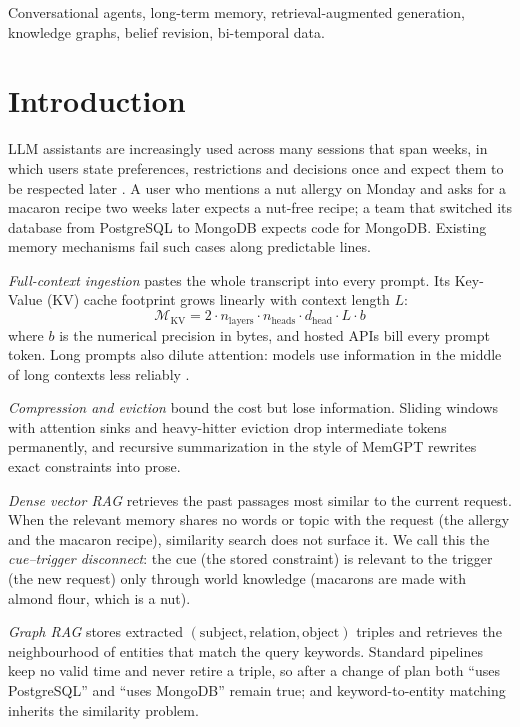\documentclass[conference]{IEEEtran}
\begin{document}
\begin{IEEEkeywords}
Conversational agents, long-term memory, retrieval-augmented generation, knowledge graphs, belief revision, bi-temporal data.
\end{IEEEkeywords}

\section{Introduction}
LLM assistants are increasingly used across many sessions that span weeks, in which users state preferences, restrictions and decisions once and expect them to be respected later \cite{b_locomo,b_msc,b_longmemeval}. A user who mentions a nut allergy on Monday and asks for a macaron recipe two weeks later expects a nut-free recipe; a team that switched its database from PostgreSQL to MongoDB expects code for MongoDB. Existing memory mechanisms fail such cases along predictable lines.

\emph{Full-context ingestion} pastes the whole transcript into every prompt. Its Key-Value (KV) cache footprint grows linearly with context length $L$:
\begin{equation}
\mathcal{M}_{\text{KV}} = 2 \cdot n_{\text{layers}} \cdot n_{\text{heads}} \cdot d_{\text{head}} \cdot L \cdot b
\end{equation}
where $b$ is the numerical precision in bytes, and hosted APIs bill every prompt token. Long prompts also dilute attention: models use information in the middle of long contexts less reliably \cite{b_lostmiddle}.

\emph{Compression and eviction} bound the cost but lose information. Sliding windows with attention sinks \cite{b_streaming} and heavy-hitter eviction \cite{b_h2o} drop intermediate tokens permanently, and recursive summarization in the style of MemGPT \cite{b_memgpt} rewrites exact constraints into prose.

\emph{Dense vector RAG} \cite{b_rag} retrieves the past passages most similar to the current request. When the relevant memory shares no words or topic with the request (the allergy and the macaron recipe), similarity search does not surface it. We call this the \emph{cue--trigger disconnect}: the cue (the stored constraint) is relevant to the trigger (the new request) only through world knowledge (macarons are made with almond flour, which is a nut).

\emph{Graph RAG} \cite{b_graphrag,b_lightrag} stores extracted $(\text{subject},\text{relation},\text{object})$ triples and retrieves the neighbourhood of entities that match the query keywords. Standard pipelines keep no valid time and never retire a triple, so after a change of plan both ``uses PostgreSQL'' and ``uses MongoDB'' remain true; and keyword-to-entity matching inherits the similarity problem.
\end{document}
